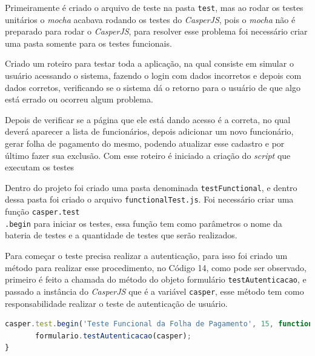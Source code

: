 \par Primeiramente é criado o arquivo de teste na pasta \texttt{test}, mas ao rodar os testes unitários o \textit{mocha} acabava rodando os testes do \textit{CasperJS}, pois o \textit{mocha} não é preparado para rodar o \textit{CasperJS}, para resolver esse problema foi necessário criar uma pasta somente para os testes funcionais.

\par Criado um roteiro para testar toda a aplicação, na qual consiste em simular o usuário acessando o sistema, fazendo o login
com dados incorretos e depois com dados corretos, verificando se o sistema dá o retorno para o usuário de que algo está errado ou ocorreu algum problema.

\par Depois de verificar se a página que ele está dando acesso é a correta, no qual deverá aparecer a lista de funcionários, depois adicionar um novo funcionário, gerar folha de pagamento do mesmo, podendo atualizar esse cadastro e por último fazer sua exclusão. Com esse roteiro é iniciado a criação do \textit{script} que executam os testes


\par Dentro do projeto foi criado uma pasta denominada \texttt{testFunctional}, e dentro dessa pasta foi criado o arquivo \texttt{functionalTest.js}. Foi necessário criar uma função \texttt{casper.test\\.begin} para iniciar os testes, essa função tem como parâmetros o nome da bateria de testes e a quantidade de testes que serão realizados.

\par Para começar o teste precisa realizar a autenticação, para isso foi criado um método para realizar esse procedimento, no Código 14, como pode ser observado, primeiro é feito a chamada do método do objeto formulário \texttt{testAutenticacao}, e passado a instância do \textit{CasperJS} que é a variável \texttt{casper}, esse método tem como responsabilidade realizar o teste de autenticação de usuário.

\newpage
\begin{lstlisting}[language=JavaScript, caption={[Chamada da função para o teste de autenticação.]{Chamada da função para o teste de autenticação. \textbf{Fonte:} Elaborado pelos autores.}}]
casper.test.begin('Teste Funcional da Folha de Pagamento', 15, function (test) {
       formulario.testAutenticacao(casper);
}

\end{lstlisting}

